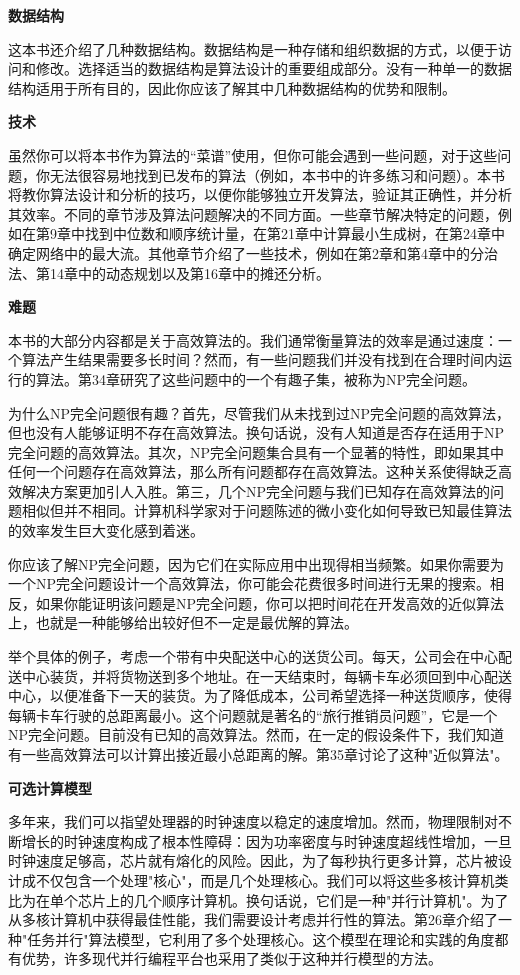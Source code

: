 \documentclass[lang=cn,newtx,10pt,scheme=chinese]{elegantbook}
\begin{document}
\textbf{数据结构}

这本书还介绍了几种数据结构。数据结构是一种存储和组织数据的方式，以便于访问和修改。选择适当的数据结构是算法设计的重要组成部分。没有一种单一的数据结构适用于所有目的，因此你应该了解其中几种数据结构的优势和限制。

\textbf{技术}

虽然你可以将本书作为算法的``菜谱''使用，但你可能会遇到一些问题，对于这些问题，你无法很容易地找到已发布的算法（例如，本书中的许多练习和问题）。本书将教你算法设计和分析的技巧，以便你能够独立开发算法，验证其正确性，并分析其效率。不同的章节涉及算法问题解决的不同方面。一些章节解决特定的问题，例如在第9章中找到中位数和顺序统计量，在第21章中计算最小生成树，在第24章中确定网络中的最大流。其他章节介绍了一些技术，例如在第2章和第4章中的分治法、第14章中的动态规划以及第16章中的摊还分析。

\textbf{难题}

本书的大部分内容都是关于高效算法的。我们通常衡量算法的效率是通过速度：一个算法产生结果需要多长时间？然而，有一些问题我们并没有找到在合理时间内运行的算法。第34章研究了这些问题中的一个有趣子集，被称为NP完全问题。

为什么NP完全问题很有趣？首先，尽管我们从未找到过NP完全问题的高效算法，但也没有人能够证明不存在高效算法。换句话说，没有人知道是否存在适用于NP完全问题的高效算法。其次，NP完全问题集合具有一个显著的特性，即如果其中任何一个问题存在高效算法，那么所有问题都存在高效算法。这种关系使得缺乏高效解决方案更加引人入胜。第三，几个NP完全问题与我们已知存在高效算法的问题相似但并不相同。计算机科学家对于问题陈述的微小变化如何导致已知最佳算法的效率发生巨大变化感到着迷。

你应该了解NP完全问题，因为它们在实际应用中出现得相当频繁。如果你需要为一个NP完全问题设计一个高效算法，你可能会花费很多时间进行无果的搜索。相反，如果你能证明该问题是NP完全问题，你可以把时间花在开发高效的近似算法上，也就是一种能够给出较好但不一定是最优解的算法。

举个具体的例子，考虑一个带有中央配送中心的送货公司。每天，公司会在中心配送中心装货，并将货物送到多个地址。在一天结束时，每辆卡车必须回到中心配送中心，以便准备下一天的装货。为了降低成本，公司希望选择一种送货顺序，使得每辆卡车行驶的总距离最小。这个问题就是著名的``旅行推销员问题''，它是一个NP完全问题。目前没有已知的高效算法。然而，在一定的假设条件下，我们知道有一些高效算法可以计算出接近最小总距离的解。第35章讨论了这种"近似算法"。

\textbf{可选计算模型}

多年来，我们可以指望处理器的时钟速度以稳定的速度增加。然而，物理限制对不断增长的时钟速度构成了根本性障碍：因为功率密度与时钟速度超线性增加，一旦时钟速度足够高，芯片就有熔化的风险。因此，为了每秒执行更多计算，芯片被设计成不仅包含一个处理"核心"，而是几个处理核心。我们可以将这些多核计算机类比为在单个芯片上的几个顺序计算机。换句话说，它们是一种"并行计算机"。为了从多核计算机中获得最佳性能，我们需要设计考虑并行性的算法。第26章介绍了一种"任务并行"算法模型，它利用了多个处理核心。这个模型在理论和实践的角度都有优势，许多现代并行编程平台也采用了类似于这种并行模型的方法。
\end{document}
